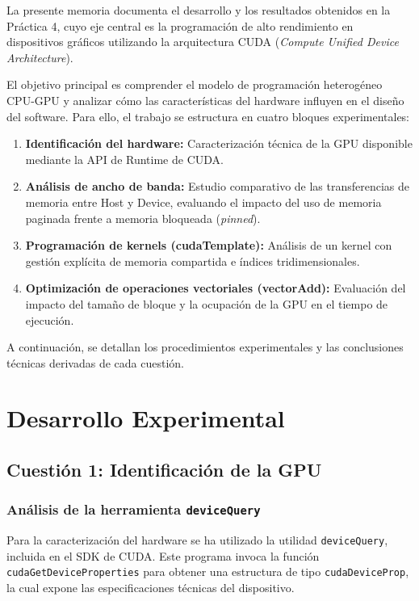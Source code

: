 \documentclass[12pt,a4paper]{report}
\begin{document}
La presente memoria documenta el desarrollo y los resultados obtenidos en la Práctica 4, cuyo eje central es la programación de alto rendimiento en dispositivos gráficos utilizando la arquitectura CUDA (\textit{Compute Unified Device Architecture}).

El objetivo principal es comprender el modelo de programación heterogéneo CPU-GPU y analizar cómo las características del hardware influyen en el diseño del software. Para ello, el trabajo se estructura en cuatro bloques experimentales:

\begin{enumerate}
    \item \textbf{Identificación del hardware:} Caracterización técnica de la GPU disponible mediante la API de Runtime de CUDA.
    \item \textbf{Análisis de ancho de banda:} Estudio comparativo de las transferencias de memoria entre Host y Device, evaluando el impacto del uso de memoria paginada frente a memoria bloqueada (\textit{pinned}).
    \item \textbf{Programación de kernels (cudaTemplate):} Análisis de un kernel con gestión explícita de memoria compartida e índices tridimensionales.
    \item \textbf{Optimización de operaciones vectoriales (vectorAdd):} Evaluación del impacto del tamaño de bloque y la ocupación de la GPU en el tiempo de ejecución.
\end{enumerate}

A continuación, se detallan los procedimientos experimentales y las conclusiones técnicas derivadas de cada cuestión.

\chapter{Desarrollo Experimental}

\section{Cuestión 1: Identificación de la GPU}

\subsection{Análisis de la herramienta \texttt{deviceQuery}}
Para la caracterización del hardware se ha utilizado la utilidad \texttt{deviceQuery}, incluida en el SDK de CUDA. Este programa invoca la función \texttt{cudaGetDeviceProperties} para obtener una estructura de tipo \texttt{cudaDeviceProp}, la cual expone las especificaciones técnicas del dispositivo.
\end{document}
